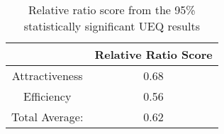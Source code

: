 \begin{table}[ht]
    \centering
    \begin{tabular}{ |c|c| } 
        \hline
        \rowcolor{light-gray}
          & Relative Ratio Score \\
        \hline
        Attractiveness & 0.68 \\
        \hline
        Efficiency & 0.56 \\
        \hline
        Total Average: & 0.62 \\
        \hline
    \end{tabular}
    \caption{Relative ratio score from the 95\% statistically significant UEQ results}
    \label{tab:relative-ratio1}
\end{table}